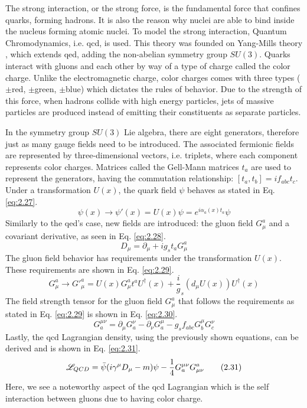The strong interaction, or the strong force, is the fundamental force that confines quarks, forming hadrons.
It is also the reason why nuclei are able to bind inside the nucleus forming atomic nuclei. 
To model the strong interaction, Quantum Chromodynamics, i.e. \gls{qcd}, is used. This theory was founded on 
Yang-Mills theory \cite{yang-mills}, which extends \gls{qed}, adding the non-abelian symmetry group $SU(3)$. 
Quarks interact with gluons and each other by way of a type of charge called the color charge. Unlike the 
electromagnetic charge, color charges comes with three types ($\pm$red, $\pm$green, $\pm$blue) which dictates
the rules of behavior. Due to the strength of this force, when hadrons collide with high energy particles, jets of massive particles are produced instead of emitting their constituents as separate particles. 
\par
In the symmetry group $SU(3)$ Lie algebra, there are eight generators, therefore just as many gauge fields need to 
be introduced. The associated fermionic fields are represented by three-dimensional vectors, i.e. triplets, where 
each component represents color charges. Matrices called the Gell-Mann matrices $t_{a}$ are used to represent 
the generators, having the commutation relationship: $[t_{a},t_{b}]=if_{abc}t_{c}$.
Under a transformation $U(x)$, the quark field $\psi$ behaves as stated in Eq. \ref{eq:2.27}.
%
\begin{equation}\label{eq:2.27}
    \psi(x) \rightarrow \psi'(x) = U(x)\psi = e^{i\alpha_{a}(x)t_{a}}\psi
\tag{2.27}    
\end{equation}
% 
Similarly to the \gls{qed}'s case, new fields are introduced: the gluon field $G^{a}_{\mu}$ and 
a covariant derivative, as seen in Eq. \ref{eq:2.28}.
%
\begin{equation}\label{eq:2.28}
    D_{\mu} = \partial_{\mu} + ig_{s}t_{a}G^{a}_{\mu}
\tag{2.28}
\end{equation}
%
The gluon field behavior has requirements under the transformation $U(x)$. These 
requirements are shown in Eq. \ref{eq:2.29}.
%
\begin{equation}\label{eq:2.29}
    G^{a}_{\mu} \rightarrow G'^{a}_{\mu} = U(x)G^{a}_{\mu}t^{a}U^{\dagger}(x) + \frac{i}g_{s}(d_{\mu}U(x))U^{\dagger}(x)
\tag{2.29}
\end{equation}
%
The field strength tensor for the gluon field $G^a_{\mu}$ that follows the requirements as stated 
in Eq. \ref{eq:2.29} is shown in Eq. \ref{eq:2.30}.
%
\begin{equation}\label{eq:2.30}
    G^{\mu\nu}_{a} = \partial_{\mu}G^{\nu}_{a} - \partial_{\nu}G^{\mu}_{a} - g_{s}f_{abc}G^{\mu}_{b}G^{\nu}_{c}
\tag{2.30}
\end{equation}
%
Lastly, the \gls{qcd} Lagrangian density, using the previously shown equations, can be derived 
and is shown in Eq. \ref{eq:2.31}.
%
\begin{equation}\label{eq:2.31}
    \mathscr{L}_{QCD} = \bar{\psi}(i\gamma^{\mu}D_{\mu} - m)\psi - \frac{1}4G^{\mu\nu}_{a}G^{a}_{\mu\nu}
\tag{2.31}
\end{equation}
%
Here, we see a noteworthy aspect of the \gls{qcd} Lagrangian which is the self interaction between 
gluons due to having color charge. 

